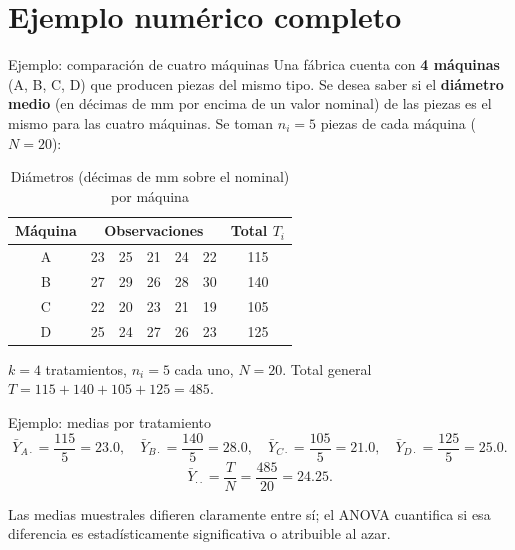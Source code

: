 \documentclass[aspectratio=169,11pt]{beamer}
\begin{document}
\section{Ejemplo numérico completo}

\begin{frame}{Ejemplo: comparación de cuatro máquinas}
Una fábrica cuenta con \textbf{4 máquinas} (A, B, C, D) que producen piezas del mismo tipo. Se desea saber si el \textbf{diámetro medio} (en décimas de mm por encima de un valor nominal) de las piezas es el mismo para las cuatro máquinas. Se toman $n_i=5$ piezas de cada máquina ($N=20$):

\begin{table}[htbp]
\centering
\begin{tabular}{c|ccccc|c}
\toprule
Máquina & \multicolumn{5}{c|}{Observaciones} & Total $T_i$ \\
\midrule
A & 23 & 25 & 21 & 24 & 22 & 115 \\
B & 27 & 29 & 26 & 28 & 30 & 140 \\
C & 22 & 20 & 23 & 21 & 19 & 105 \\
D & 25 & 24 & 27 & 26 & 23 & 125 \\
\bottomrule
\end{tabular}
\caption{Diámetros (décimas de mm sobre el nominal) por máquina}
\end{table}

$k=4$ tratamientos, $n_i=5$ cada uno, $N=20$. Total general $T = 115+140+105+125=485$.
\end{frame}

\begin{frame}{Ejemplo: medias por tratamiento}
\[
\bar Y_{A\cdot} = \frac{115}{5}=23.0, \quad \bar Y_{B\cdot} = \frac{140}{5}=28.0, \quad \bar Y_{C\cdot} = \frac{105}{5}=21.0, \quad \bar Y_{D\cdot} = \frac{125}{5}=25.0.
\]
\[
\bar Y_{\cdot\cdot} = \frac{T}{N} = \frac{485}{20} = 24.25.
\]

\begin{center}
\end{center}
Las medias muestrales difieren claramente entre sí; el ANOVA cuantifica si esa diferencia es estadísticamente significativa o atribuible al azar.
\end{frame}
\end{document}
